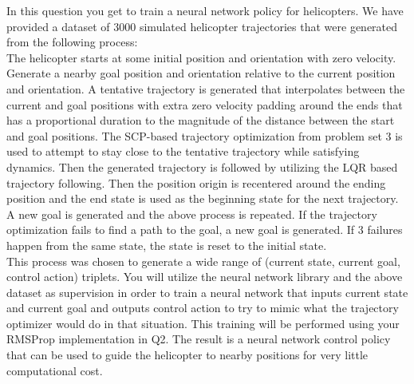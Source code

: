 \documentclass{article}
\begin{document}
In this question you get to train a neural network policy for helicopters.
We have provided a dataset of 3000 simulated helicopter trajectories that were generated from the following process:
\\

The helicopter starts at some initial position and orientation with zero velocity.  
Generate a nearby goal position and orientation relative to the current position and orientation.
A tentative trajectory is generated that interpolates between the current and goal positions with extra zero velocity padding around the ends 
that has a proportional duration to the magnitude of the distance between the start and goal positions.
The SCP-based trajectory optimization from problem set 3 is used to attempt to stay close to the tentative trajectory while satisfying dynamics.
Then the generated trajectory is followed by utilizing the LQR based trajectory following.
Then the position origin is recentered around the ending position and the end state is used as the beginning state for the next trajectory.
A new goal is generated and the above process is repeated.
If the trajectory optimization fails to find a path to the goal, a new goal is generated.
If 3 failures happen from the same state, the state is reset to the initial state.
\\

This process was chosen to generate a wide range of (current state, current goal, control action) triplets.
You will utilize the neural network library and the above dataset as supervision in order to train a neural network that inputs current state 
and current goal and outputs control action to try to mimic what the trajectory optimizer would do in that situation.
This training will be performed using your RMSProp implementation in Q2.
The result is a neural network control policy that can be used to guide the helicopter to nearby positions for very little computational cost.
\\
\end{document}
